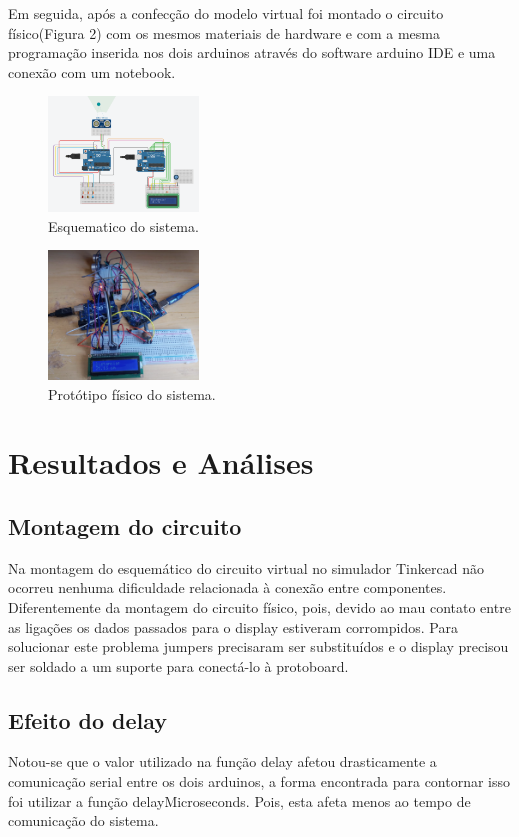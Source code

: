 \documentclass[conference]{IEEEtran}
\begin{document}
Em seguida, após a confecção do modelo virtual foi montado o circuito físico(Figura 2) com os mesmos materiais de hardware e com a mesma programação inserida nos dois arduinos através do software arduino IDE e uma conexão com um notebook.


\begin{figure}[htbp]
    \centerline{
        \includegraphics[width=4cm]{images/esquema-arduino.png}
    }
    \caption{Esquematico do sistema.}
    \label{fig}
\end{figure}

\begin{figure}[htbp]
    \centerline{
        \includegraphics[width=4cm]{images/esquema-arduino-fisico.png}
    }
    \caption{Protótipo físico do sistema.}
    \label{fig}
\end{figure}

\section{Resultados e Análises}

\subsection{Montagem do circuito}

Na montagem do esquemático do circuito virtual no simulador Tinkercad não ocorreu nenhuma dificuldade relacionada à conexão entre componentes.
Diferentemente da montagem do circuito físico, pois, devido ao mau contato entre as ligações os dados passados para o display estiveram corrompidos. Para solucionar este problema jumpers precisaram ser substituídos
e o display precisou ser soldado a um suporte para conectá-lo à protoboard.

\subsection{Efeito do delay}
Notou-se que o valor utilizado na função delay afetou drasticamente a comunicação serial entre os dois arduinos, a forma encontrada para contornar isso foi utilizar a função delayMicroseconds. Pois, esta afeta menos ao tempo de comunicação do sistema.
\end{document}
